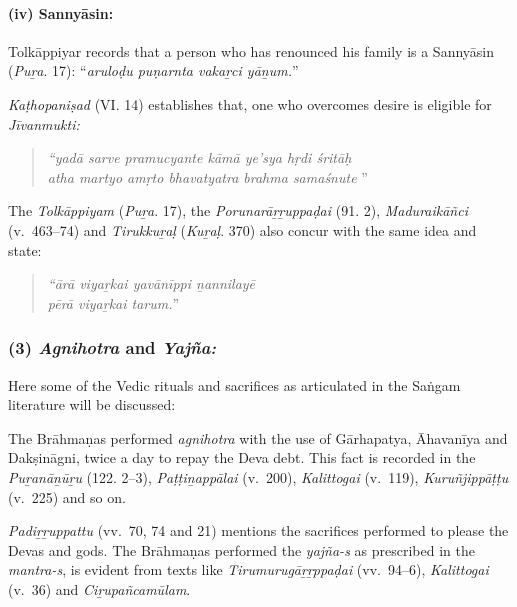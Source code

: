 \paragraph*{(iv) Sannyāsin:}

\vskip -7pt

Tolkāppiyar records that a person who has renounced his family is a Sannyāsin (\textit{Puṟa}. 17): “\textit{aruloḍu puṇarnta vakaṟci yāṉum.}”

\textit{Kaṭhopaniṣad} (VI. 14) establishes that, one who overcomes desire is eligible for \textit{Jīvanmukti:}

\begin{quote}
\textit{“yadā sarve pramucyante kāmā ye’sya hṛdi śritāḥ}\\\textit{atha martyo amṛto bhavatyatra brahma samaśnute }”
\end{quote}

The \textit{Tolkāppiyam} (\textit{Puṟa}. 17), the \textit{Porunarāṟṟuppaḍai} (91. 2), \textit{Maduraikāñci} (v.~463–74) and \textit{Tirukkuṟaḷ} (\textit{Kuṟaḷ}. 370) also concur with the same idea and state:

\begin{quote}
\textit{“ārā viyaṟkai yavānīppi ṉannilayē}\\\textit{pērā viyaṟkai tarum.}”
\end{quote}



\subsubsection*{(3) \textit{Agnihotra} and \textit{Yajña:}}

\vskip -7pt

Here some of the Vedic rituals and sacrifices as articulated in the Saṅgam literature will be discussed:

The Brāhmaṇas performed \textit{agnihotra} with the use of Gārhapatya, Āhavanīya and Dakṣināgni, twice a day to repay the Deva debt. This fact is recorded in the \textit{Puṟanāṉūṟu} (122. 2–3), \textit{Paṭṭiṉappālai} (v.~200), \textit{Kalittogai} (v.~119), \textit{Kuruñjippāṭṭu} (v.~225) and so on.

\textit{Padiṟṟuppattu} (vv.~70, 74 and 21) mentions the sacrifices performed to please the Devas and gods. The Brāhmaṇas performed the \textit{yajña-s} as prescribed in the \textit{mantra-s}, is evident from texts like \textit{Tirumurugāṟṟppaḍai} (vv.~94–6), \textit{Kalittogai} (v.~36) and \textit{Ciṟupañcamūlam}.

